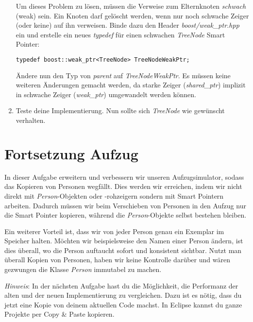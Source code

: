 \begin{enumerate}
Um dieses Problem zu lösen, müssen die Verweise zum Elternknoten \emph{schwach} (weak) sein.
Ein Knoten darf gelöscht werden, wenn nur noch schwache Zeiger (oder keine) auf ihn verweisen.
Binde dazu den Header \emph{boost/weak\_ptr.hpp} ein und erstelle ein neues \emph{typedef} für einen schwachen \emph{TreeNode} Smart Pointer:

\begin{lstlisting}
typedef boost::weak_ptr<TreeNode> TreeNodeWeakPtr;
\end{lstlisting}

Ändere nun den Typ von \emph{parent} auf \emph{TreeNodeWeakPtr}.
Es müssen keine weiteren Änderungen gemacht werden, da starke Zeiger (\emph{shared\_ptr}) implizit in schwache Zeiger (\emph{weak\_ptr}) umgewandelt werden können.

\item
Teste deine Implementierung.
Nun sollte sich \emph{TreeNode} wie gewünscht verhalten.

\end{enumerate}



\section{Fortsetzung Aufzug}
In dieser Aufgabe erweitern und verbessern wir unseren Aufzugsimulator, sodass das Kopieren von Personen wegfällt.
Dies werden wir erreichen, indem wir nicht direkt mit \emph{Person}-Objekten oder -rohzeigern sondern mit Smart Pointern arbeiten.
Dadurch müssen wir beim Verschieben von Personen in den Aufzug nur die Smart Pointer kopieren, während die \emph{Person}-Objekte selbst bestehen bleiben.

Ein weiterer Vorteil ist, dass wir von jeder Person genau ein Exemplar im Speicher halten.
Möchten wir beispielsweise den Namen einer Person ändern, ist dies überall, wo die Person auftaucht sofort und konsistent sichtbar.
Nutzt man überall Kopien von Personen, haben wir keine Kontrolle darüber und wären gezwungen die Klasse \emph{Person} immutabel zu machen.

\emph{Hinweis}:
In der nächsten Aufgabe hast du die Möglichkeit, die Performanz der alten und der neuen Implementierung zu vergleichen.
Dazu ist es nötig, dass du jetzt eine Kopie von deinem aktuellen Code machst.
In Eclipse kannst du ganze Projekte per Copy \& Paste kopieren.

